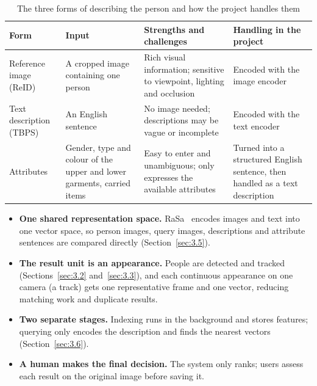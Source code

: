 \begin{table}[H]
\centering
\caption{The three forms of describing the person and how the project handles them}
\label{tab:query-modes}
\begin{tabularx}{\textwidth}{|>{\raggedright\arraybackslash}p{2.6cm}|L|L|L|}
\hline
\textbf{Form} & \textbf{Input} & \textbf{Strengths and challenges} & \textbf{Handling in the project} \\
\hline
Reference image (ReID) & A cropped image containing one person & Rich visual information; sensitive to viewpoint, lighting and occlusion & Encoded with the image encoder \\
\hline
Text description (TBPS) & An English sentence & No image needed; descriptions may be vague or incomplete & Encoded with the text encoder \\
\hline
Attributes & Gender, type and colour of the upper and lower garments, carried items & Easy to enter and unambiguous; only expresses the available attributes & Turned into a structured English sentence, then handled as a text description \\
\hline
\end{tabularx}
\end{table}

\begin{itemize}
    \item \textbf{One shared representation space.} RaSa~\cite{bai2023rasa} encodes images and text into one vector space, so person images, query images, descriptions and attribute sentences are compared directly (Section~\ref{sec:3.5}).
    \item \textbf{The result unit is an appearance.} People are detected and tracked (Sections~\ref{sec:3.2} and~\ref{sec:3.3}), and each continuous appearance on one camera (a track) gets one representative frame and one vector, reducing matching work and duplicate results.
    \item \textbf{Two separate stages.} Indexing runs in the background and stores features; querying only encodes the description and finds the nearest vectors (Section~\ref{sec:3.6}).
    \item \textbf{A human makes the final decision.} The system only ranks; users assess each result on the original image before saving it.
\end{itemize}
